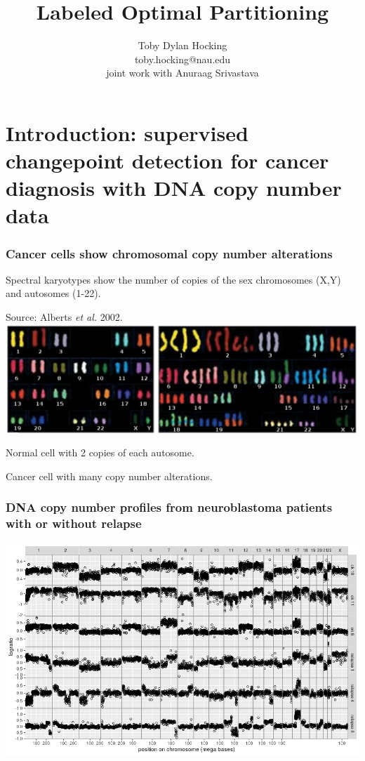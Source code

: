 \documentclass{beamer}
\begin{document}
\title{Labeled Optimal Partitioning}

\author{
  Toby Dylan Hocking\\
  toby.hocking@nau.edu\\
  joint work with Anuraag Srivastava}


\maketitle

\section{Introduction: supervised changepoint detection for cancer diagnosis with DNA copy number data}

\begin{frame}
  \frametitle{Cancer cells show chromosomal copy number alterations}
  Spectral karyotypes show the number of copies of the sex chromosomes
  (X,Y) and autosomes (1-22). 

  Source: Alberts \emph{et al.} 2002.
\vskip 0.1in
  \includegraphics[width=\textwidth]{Karyo-both}
\vskip 0.1in
  \begin{minipage}{0.4\linewidth}
    Normal cell with 2 copies of each autosome.
  \end{minipage}
\linewidth
  \begin{minipage}{0.4\linewidth}
Cancer cell with many copy number alterations.
  \end{minipage}
\end{frame}

\begin{frame}
  \frametitle{DNA copy number profiles from neuroblastoma patients with or without relapse}

  \hspace*{-1cm}
  \includegraphics[width=1.15\textwidth]{figure-neuroblastoma-clinical}
  
\end{frame}
\end{document}
